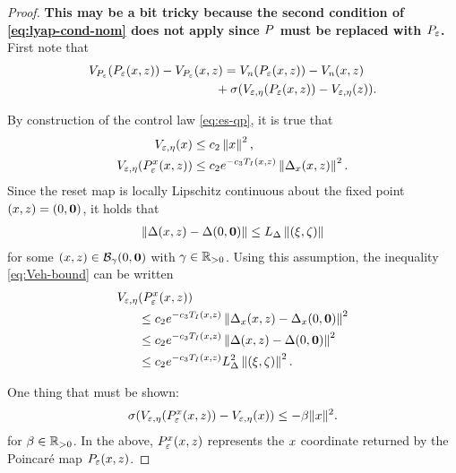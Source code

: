 \documentclass[twocolumn]{article}
\begin{document}
\begin{proof}
  {\bf This may be a bit tricky because the second condition of \eqref{eq:lyap-cond-nom} does not apply since $\P$ must be replaced with $\Pe$.}
  First note that
  \begin{align}
    \lefteqn{\VP(\Pe(\zdx, \zdz)) - \VP(\zdx, \zdz) = \Vn(\Pe(\zdx, \zdz)) - \Vn(\zdx, \zdz)}\\
    \nonumber
    &&\hspace{3.2cm}\mbox{} + \sigma(\Vee(\Pe(\zdx, \zdz)) - \Vee(\zdz)).
  \end{align}

  By construction of the control law \eqref{eq:es-qp}, it is true that
  \begin{align}
    \label{eq:Veh-bound}
    \Vee(\zdx) &\leq c_{2} \left\| \zdx \right\|^{2},\\
    \nonumber
    \Vee(\Pe^{\zdx}(\zdx, \zdz)) &\leq c_{2} e^{-c_{3} T_{I}(\zdx, \zdz)} \left\| \Delta_{\zdx}(\zdx, \zdz) \right\|^{2}.
  \end{align}
  Since the reset map is locally Lipschitz continuous about the fixed point $(\zdx, \zdz) = (0, \boldzero)$, it holds that
  \begin{align}
    \left\| \Delta(\zdx, \zdz) - \Delta(0, \boldzero) \right\| \leq L_{\Delta} \left\| (\zdxp, \zdzp) \right\|
  \end{align}
  for some $(\zdx, \zdz) \in \B_{\gamma}(0, \boldzero)$ with $\gamma \in \Rpd$.
  Using this assumption, the inequality \eqref{eq:Veh-bound} can be written
  \begin{align}
    \nonumber
    \Vee&(\Pe^{\zdx}(\zdx, \zdz))\\
    \nonumber
    &\leq c_{2} e^{-c_{3} T_{I}(\zdx, \zdz)} \left\| \Delta_{\zdx}(\zdx, \zdz) - \Delta_{\zdx}(0, \boldzero) \right\|^{2}\\
    \nonumber
    &\leq c_{2} e^{-c_{3} T_{I}(\zdx, \zdz)} \left\| \Delta(\zdx, \zdz) - \Delta(0, \boldzero) \right\|^{2}\\
    \nonumber
    &\leq c_{2} e^{-c_{3} T_{I}(\zdx, \zdz)} L_{\Delta}^{2} \left\| (\zdxp, \zdzp) \right\|^{2}.
  \end{align}

  One thing that must be shown:
  \begin{align}
    \sigma(\Vee(\Pe^{\zdx}(\zdx, \zdz)) - \Vee(\zdx)) \leq -\beta \| \zdx \|^{2}.
  \end{align}
  for $\beta \in \Rpd$.
  In the above, $\Pe^{\zdx}(\zdx, \zdz)$ represents the $\zdx$ coordinate returned by the Poincar{\'e} map $\Pe(\zdx, \zdz)$.
\end{proof}
\end{document}
